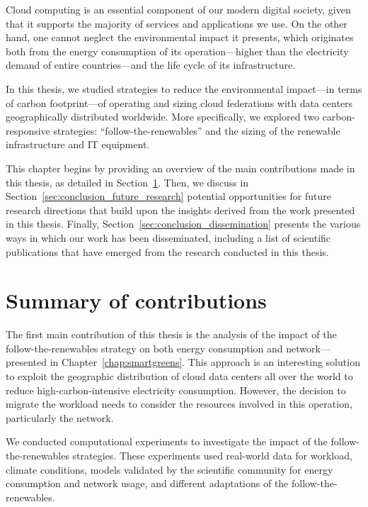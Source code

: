 Cloud computing is an essential component of our modern digital society, given that it supports the majority of services and applications we use. On the other hand, one cannot neglect the environmental impact it presents, which originates both from the energy consumption of its operation---higher than the electricity demand of entire countries---and the life cycle of its infrastructure.

In this thesis, we studied strategies to reduce the environmental impact---in terms of carbon footprint---of operating and sizing cloud federations with data centers geographically distributed worldwide. More specifically, we explored two carbon-responsive strategies: ``follow-the-renewables'' and the sizing of the renewable infrastructure and IT equipment.

This chapter begins by providing an overview of the main contributions made in this thesis, as detailed in Section~\ref{sec:conclusion_summary}. Then, we discuss in Section~\ref{sec:conclusion_future_research} potential opportunities for future research directions that build upon the insights derived from the work presented in this thesis. Finally, Section~\ref{sec:conclusion_dissemination} presents the various ways in which our work has been disseminated, including a list of scientific publications that have emerged from the research conducted in this thesis.


\section{Summary of contributions }

\label{sec:conclusion_summary}

The first main contribution of this thesis is the analysis of the impact of the follow-the-renewables strategy on both energy consumption and network---presented in Chapter~\ref{chap:smartgreens}. This approach is an interesting solution to exploit the geographic distribution of cloud data centers all over the world to reduce high-carbon-intensive electricity consumption. However, the decision to migrate the workload needs to consider the resources involved in this operation, particularly the network. 

We conducted computational experiments to investigate the impact of the follow-the-renewables strategies. These experiments used real-world data for workload, climate conditions, models validated by the scientific community for energy consumption and network usage, and different adaptations of the follow-the-renewables. 

